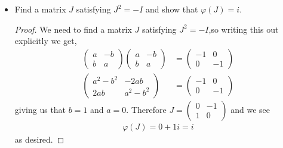 \documentclass[11pt]{article}
\newenvironment{problem}[2][Problem\!]{\begin{trivlist}
\item[\hskip \labelsep {\bfseries #1}\hskip \labelsep {\bfseries #2.}]}{\end{trivlist}}
\renewcommand{\phi}{\varphi}
\begin{document}
\begin{problem}{1.2}
\begin{itemize}
\item[(c)] Find a matrix $J$ satisfying $J^2 = -I$ and show that $\phi(J) = i$.
\begin{example}
    \begin{proof}
        We need to find a matrix $J$ satisfying $J^{2} = -I$,so writing this out explicitly we get,
        \begin{align*}
            \begin{pmatrix}
                a & -b \\ b & a
            \end{pmatrix}\begin{pmatrix}
                a & -b \\ b & a
            \end{pmatrix} &= \begin{pmatrix}-1 & 0 \\ 0 & -1 \end{pmatrix} \\\begin{pmatrix}
                a^{2} -b^{2} & -2ab \\ 2ab & a^{2}-b^{2}
            \end{pmatrix} &=\begin{pmatrix}-1 & 0 \\ 0 & -1 \end{pmatrix}
        \end{align*}
        giving us that $b = 1$ and $a = 0$. Therefore $J = \begin{pmatrix}
            0 & -1 \\ 1 & 0
        \end{pmatrix}$ and we see
        \begin{align*}
            \phi(J) = 0 + 1i = i 
        \end{align*}
        as desired. 
    \end{proof}
\end{example}
\end{itemize}

\end{problem}


\newpage  %
\end{document}
